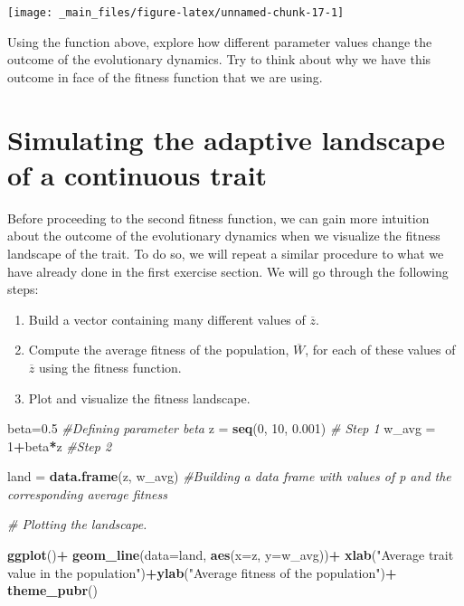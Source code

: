 \documentclass[
]{book}
\newenvironment{Shaded}{\begin{snugshade}}{\end{snugshade}}
\newcommand{\AttributeTok}[1]{\textcolor[rgb]{0.13,0.29,0.53}{#1}}
\newcommand{\CommentTok}[1]{\textcolor[rgb]{0.56,0.35,0.01}{\textit{#1}}}
\newcommand{\DecValTok}[1]{\textcolor[rgb]{0.00,0.00,0.81}{#1}}
\newcommand{\FloatTok}[1]{\textcolor[rgb]{0.00,0.00,0.81}{#1}}
\newcommand{\FunctionTok}[1]{\textcolor[rgb]{0.13,0.29,0.53}{\textbf{#1}}}
\newcommand{\NormalTok}[1]{#1}
\newcommand{\OtherTok}[1]{\textcolor[rgb]{0.56,0.35,0.01}{#1}}
\newcommand{\SpecialCharTok}[1]{\textcolor[rgb]{0.81,0.36,0.00}{\textbf{#1}}}
\newcommand{\StringTok}[1]{\textcolor[rgb]{0.31,0.60,0.02}{#1}}
\begin{document}
\texttt{[image: \_main\_files/figure-latex/unnamed-chunk-17-1]}

Using the function above, explore how different parameter values change the outcome of the evolutionary dynamics. Try to think about why we have this outcome in face of the fitness function that we are using.

\hypertarget{simulating-the-adaptive-landscape-of-a-continuous-trait}{%
\section{Simulating the adaptive landscape of a continuous trait}\label{simulating-the-adaptive-landscape-of-a-continuous-trait}}

Before proceeding to the second fitness function, we can gain more intuition about the outcome of the evolutionary dynamics when we visualize the fitness landscape of the trait. To do so, we will repeat a similar procedure to what we have already done in the first exercise section. We will go through the following steps:

\begin{enumerate}
\def\labelenumi{\arabic{enumi}.}
\item
  Build a vector containing many different values of \(\overline{z}\).
\item
  Compute the average fitness of the population, \(\overline{W}\), for each of these values of \(\overline{z}\) using the fitness function.
\item
  Plot and visualize the fitness landscape.
\end{enumerate}

\begin{Shaded}
\begin{Highlighting}[]
\NormalTok{beta}\OtherTok{=}\FloatTok{0.5} \CommentTok{\#Defining parameter beta}
\NormalTok{z }\OtherTok{=} \FunctionTok{seq}\NormalTok{(}\DecValTok{0}\NormalTok{, }\DecValTok{10}\NormalTok{, }\FloatTok{0.001}\NormalTok{) }\CommentTok{\# Step 1}
\NormalTok{w\_avg }\OtherTok{=} \DecValTok{1}\SpecialCharTok{+}\NormalTok{beta}\SpecialCharTok{*}\NormalTok{z }\CommentTok{\#Step 2}

\NormalTok{land }\OtherTok{=} \FunctionTok{data.frame}\NormalTok{(z, w\_avg) }\CommentTok{\#Building a data frame with values of p and the corresponding average fitness}

\CommentTok{\# Plotting the landscape.}

\FunctionTok{ggplot}\NormalTok{()}\SpecialCharTok{+}
  \FunctionTok{geom\_line}\NormalTok{(}\AttributeTok{data=}\NormalTok{land, }\FunctionTok{aes}\NormalTok{(}\AttributeTok{x=}\NormalTok{z, }\AttributeTok{y=}\NormalTok{w\_avg))}\SpecialCharTok{+}
  \FunctionTok{xlab}\NormalTok{(}\StringTok{"Average trait value in the population"}\NormalTok{)}\SpecialCharTok{+}\FunctionTok{ylab}\NormalTok{(}\StringTok{"Average fitness of the population"}\NormalTok{)}\SpecialCharTok{+}
  \FunctionTok{theme\_pubr}\NormalTok{()}
\end{Highlighting}
\end{Shaded}
\end{document}
